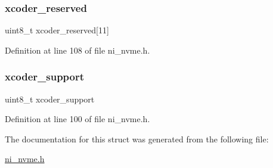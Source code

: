 \mbox{\label{struct__ni__nvme__identify_a9efc6e252c3c0c1e40c022f964154c8a}} 
\subsubsection{\texorpdfstring{xcoder\_reserved}{xcoder\_reserved}}
{\footnotesize\ttfamily uint8\+\_\+t xcoder\+\_\+reserved\mbox{[}11\mbox{]}}



Definition at line 108 of file ni\+\_\+nvme.\+h.

\mbox{\label{struct__ni__nvme__identify_a3d94a371cc34463cb981c3457b871468}} 
\subsubsection{\texorpdfstring{xcoder\_support}{xcoder\_support}}
{\footnotesize\ttfamily uint8\+\_\+t xcoder\+\_\+support}



Definition at line 100 of file ni\+\_\+nvme.\+h.



The documentation for this struct was generated from the following file\+:\begin{DoxyCompactItemize}
\item 
\mbox{\hyperlink{ni__nvme_8h}{ni\+\_\+nvme.\+h}}\end{DoxyCompactItemize}
